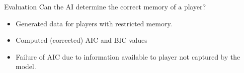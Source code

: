 \documentclass[final]{beamer}
\begin{document}
{\begin{frame}{}
\begin{center}
\begin{columns}[t]
\begin{column}{0.32\textwidth}
\begin{block}{\huge Evaluation}
\vspace{1cm}
{\Large Can the AI determine the correct memory of a player?}
\begin{itemize}
\item Generated data for players with restricted memory.
\item Computed (corrected) AIC and BIC values
\item Failure of AIC due to information available to player not captured by the model.
\end{itemize}

\vspace{1cm}


\end{block}
\end{column}
\end{columns}
\end{center}
\end{frame}}
\end{document}

